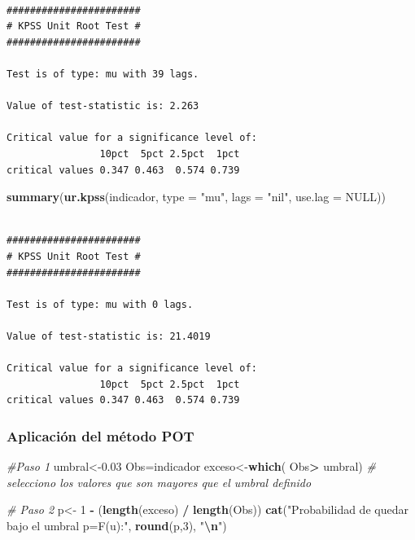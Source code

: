 \documentclass[
  12pt]{article}
\newenvironment{Shaded}{\begin{snugshade}}{\end{snugshade}}
\newcommand{\AttributeTok}[1]{\textcolor[rgb]{0.13,0.29,0.53}{#1}}
\newcommand{\CommentTok}[1]{\textcolor[rgb]{0.56,0.35,0.01}{\textit{#1}}}
\newcommand{\ConstantTok}[1]{\textcolor[rgb]{0.56,0.35,0.01}{#1}}
\newcommand{\DecValTok}[1]{\textcolor[rgb]{0.00,0.00,0.81}{#1}}
\newcommand{\FloatTok}[1]{\textcolor[rgb]{0.00,0.00,0.81}{#1}}
\newcommand{\FunctionTok}[1]{\textcolor[rgb]{0.13,0.29,0.53}{\textbf{#1}}}
\newcommand{\NormalTok}[1]{#1}
\newcommand{\OtherTok}[1]{\textcolor[rgb]{0.56,0.35,0.01}{#1}}
\newcommand{\SpecialCharTok}[1]{\textcolor[rgb]{0.81,0.36,0.00}{\textbf{#1}}}
\newcommand{\StringTok}[1]{\textcolor[rgb]{0.31,0.60,0.02}{#1}}
\begin{document}
\begin{verbatim}

####################### 
# KPSS Unit Root Test # 
####################### 

Test is of type: mu with 39 lags. 

Value of test-statistic is: 2.263 

Critical value for a significance level of: 
                10pct  5pct 2.5pct  1pct
critical values 0.347 0.463  0.574 0.739
\end{verbatim}

\begin{Shaded}
\begin{Highlighting}[]
\FunctionTok{summary}\NormalTok{(}\FunctionTok{ur.kpss}\NormalTok{(indicador, }\AttributeTok{type =} \StringTok{"mu"}\NormalTok{, }
                \AttributeTok{lags =} \StringTok{"nil"}\NormalTok{, }\AttributeTok{use.lag =} \ConstantTok{NULL}\NormalTok{))}
\end{Highlighting}
\end{Shaded}

\begin{verbatim}

####################### 
# KPSS Unit Root Test # 
####################### 

Test is of type: mu with 0 lags. 

Value of test-statistic is: 21.4019 

Critical value for a significance level of: 
                10pct  5pct 2.5pct  1pct
critical values 0.347 0.463  0.574 0.739
\end{verbatim}

\newpage

\subsubsection{Aplicación del método
POT}\label{aplicaciuxf3n-del-muxe9todo-pot}

\begin{Shaded}
\begin{Highlighting}[]
 \CommentTok{\#Paso 1}
\NormalTok{umbral}\OtherTok{\textless{}{-}}\FloatTok{0.03}
\NormalTok{Obs}\OtherTok{=}\NormalTok{indicador}
\NormalTok{exceso}\OtherTok{\textless{}{-}}\FunctionTok{which}\NormalTok{( Obs}\SpecialCharTok{\textgreater{}}\NormalTok{ umbral) }\CommentTok{\# selecciono los valores que son mayores que el umbral definido}

\CommentTok{\# Paso 2}
\NormalTok{p}\OtherTok{\textless{}{-}} \DecValTok{1} \SpecialCharTok{{-}}\NormalTok{ (}\FunctionTok{length}\NormalTok{(exceso) }\SpecialCharTok{/} \FunctionTok{length}\NormalTok{(Obs)) }
\FunctionTok{cat}\NormalTok{(}\StringTok{"Probabilidad de quedar bajo el umbral p=F(u):"}\NormalTok{, }\FunctionTok{round}\NormalTok{(p,}\DecValTok{3}\NormalTok{), }\StringTok{"}\SpecialCharTok{\textbackslash{}n}\StringTok{"}\NormalTok{)}
\end{Highlighting}
\end{Shaded}
\end{document}
